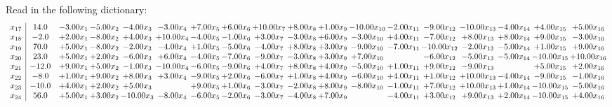 \documentclass[9pt]{article}
\begin{document}
Read in the following dictionary:
\[\begin{array}{c| c c@{\hskip 2pt} c@{\hskip 2pt} c@{\hskip 2pt} c@{\hskip 2pt} c@{\hskip 2pt} c@{\hskip 2pt} c@{\hskip 2pt} c@{\hskip 2pt} c@{\hskip 2pt} c@{\hskip 2pt} c@{\hskip 2pt} c@{\hskip 2pt} c@{\hskip 2pt} c@{\hskip 2pt} c@{\hskip 2pt} c@{\hskip 2pt} }
 x_{17}   &  14.0 & -3.00 x_{1} & -5.00 x_{2} & -4.00 x_{3} & -3.00 x_{4} & +  7.00 x_{5} & +  6.00 x_{6} & + 10.00 x_{7} & +  8.00 x_{8} & +  1.00 x_{9} & -10.00 x_{10} & -2.00 x_{11} & -9.00 x_{12} & -10.00 x_{13} & -4.00 x_{14} & +  4.00 x_{15} & +  5.00 x_{16}\\
 x_{18}   &  -2.0 & +  2.00 x_{1} & -8.00 x_{2} & +  4.00 x_{3} & + 10.00 x_{4} & -4.00 x_{5} & -1.00 x_{6} & +  3.00 x_{7} & -3.00 x_{8} & +  6.00 x_{9} & -3.00 x_{10} & +  4.00 x_{11} & -7.00 x_{12} & +  8.00 x_{13} & +  8.00 x_{14} & +  9.00 x_{15} & -3.00 x_{16}\\
 x_{19}   &  70.0 & +  5.00 x_{1} & -8.00 x_{2} & -2.00 x_{3} & -4.00 x_{4} & +  1.00 x_{5} & -5.00 x_{6} & -4.00 x_{7} & +  8.00 x_{8} & +  3.00 x_{9} & -9.00 x_{10} & -7.00 x_{11} & -10.00 x_{12} & -2.00 x_{13} & -5.00 x_{14} & +  1.00 x_{15} & +  9.00 x_{16}\\
 x_{20}   &  23.0 & +  5.00 x_{1} & +  2.00 x_{2} & -6.00 x_{3} & +  6.00 x_{4} & -4.00 x_{5} & -7.00 x_{6} & -9.00 x_{7} & -3.00 x_{8} & +  3.00 x_{9} & +  7.00 x_{10} &   & -6.00 x_{12} & -5.00 x_{13} & -5.00 x_{14} & -10.00 x_{15} & + 10.00 x_{16}\\
 x_{21}   &  -12.0 & +  9.00 x_{1} & +  5.00 x_{2} & -1.00 x_{3} & -10.00 x_{4} & -6.00 x_{5} & -9.00 x_{6} & +  4.00 x_{7} & +  8.00 x_{8} & +  4.00 x_{9} & -5.00 x_{10} & +  1.00 x_{11} & +  9.00 x_{12} & -9.00 x_{13} &   & +  5.00 x_{15} & +  2.00 x_{16}\\
 x_{22}   &  -8.0 & +  1.00 x_{1} & +  9.00 x_{2} & +  8.00 x_{3} & +  3.00 x_{4} & -9.00 x_{5} & +  2.00 x_{6} & -6.00 x_{7} & +  1.00 x_{8} & +  4.00 x_{9} & -6.00 x_{10} & +  4.00 x_{11} & +  1.00 x_{12} & + 10.00 x_{13} & -4.00 x_{14} & -9.00 x_{15} & -1.00 x_{16}\\
 x_{23}   &  -10.0 & +  4.00 x_{1} & +  2.00 x_{2} & +  5.00 x_{3} &   & +  9.00 x_{5} & +  1.00 x_{6} & -3.00 x_{7} & -2.00 x_{8} & +  8.00 x_{9} & -8.00 x_{10} & -1.00 x_{11} & +  7.00 x_{12} & + 10.00 x_{13} & +  1.00 x_{14} & -10.00 x_{15} & -5.00 x_{16}\\
 x_{24}   &  56.0 & +  5.00 x_{1} & +  3.00 x_{2} & -10.00 x_{3} & -8.00 x_{4} & -6.00 x_{5} & -2.00 x_{6} & -3.00 x_{7} & -4.00 x_{8} & +  7.00 x_{9} &   & -4.00 x_{11} & +  3.00 x_{12} & +  9.00 x_{13} & +  2.00 x_{14} & -10.00 x_{15} & +  4.00 x_{16}\\

\end{array}\]
\end{document}

